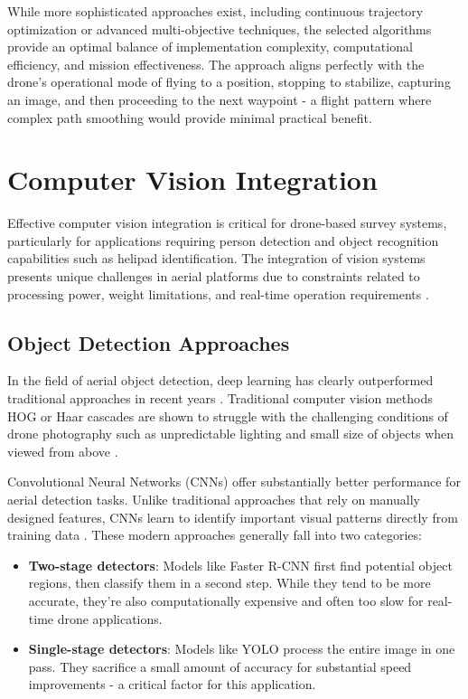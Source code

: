 While more sophisticated approaches exist, including continuous trajectory optimization or advanced multi-objective techniques, the selected algorithms provide an optimal balance of implementation complexity, computational efficiency, and mission effectiveness. The approach aligns perfectly with the drone's operational mode of flying to a position, stopping to stabilize, capturing an image, and then proceeding to the next waypoint - a flight pattern where complex path smoothing would provide minimal practical benefit.
\section{Computer Vision Integration}

Effective computer vision integration is critical for drone-based survey systems, particularly for applications requiring person detection and object recognition capabilities such as helipad identification. The integration of vision systems presents unique challenges in aerial platforms due to constraints related to processing power, weight limitations, and real-time operation requirements \cite{Hossain2019}.

\subsection{Object Detection Approaches}

In the field of aerial object detection, deep learning has clearly outperformed traditional approaches in recent years \cite{Zhang2021, Carrio2018}. Traditional computer vision methods HOG or Haar cascades are shown to struggle with the challenging conditions of drone photography such as unpredictable lighting and small size of objects when viewed from above \cite{AlKaff2018, Kyrkou2019}.

Convolutional Neural Networks (CNNs) offer substantially better performance for aerial detection tasks. Unlike traditional approaches that rely on manually designed features, CNNs learn to identify important visual patterns directly from training data \cite{Hossain2019}. These modern approaches generally fall into two categories:


\begin{itemize}
    \item \textbf{Two-stage detectors}: Models like Faster R-CNN \cite{Ren2017} first find potential object regions, then classify them in a second step. While they tend to be more accurate, they're also computationally expensive and often too slow for real-time drone applications.
    
    \item \textbf{Single-stage detectors}: Models like YOLO \cite{Redmon2016} process the entire image in one pass. They sacrifice a small amount of accuracy for substantial speed improvements - a critical factor for this application.
\end{itemize}

